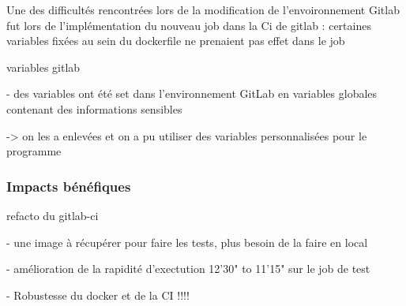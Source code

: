 Une des difficultés rencontrées lors de la modification de l'envoironnement Gitlab fut lors de l'implémentation du nouveau job dans la Ci de gitlab : certaines variables fixées au sein du dockerfile ne prenaient pas effet dans le job 


variables gitlab

- des variables ont été set dans l'environnement GitLab en variables globales contenant des informations sensibles

-> on les a enlevées et on a pu utiliser des variables personnalisées pour le programme

\subsubsection{Impacts bénéfiques}
refacto du gitlab-ci
    
- une image à récupérer pour faire les tests, plus besoin de la faire en local

- amélioration de la rapidité d'exectution 12'30" to 11'15" sur le job de test

- Robustesse du docker et de la CI !!!!
